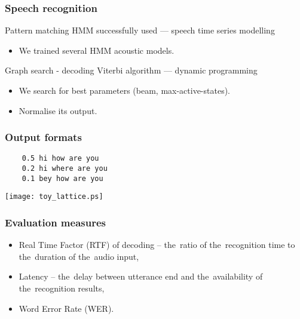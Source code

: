 \begin{frame}\frametitle{Speech recognition} 
    \begin{block}{Pattern matching}
        HMM successfully used --- speech time series modelling
        \begin{itemize}
            \item We trained several HMM acoustic models.
        \end{itemize}
    \end{block}
    \begin{exampleblock}{Graph search - decoding}
        Viterbi algorithm --- dynamic programming
        \begin{itemize}
            \item We search for best parameters (beam, max-active-states).
            \item Normalise its output.
        \end{itemize}
    \end{exampleblock}
\end{frame}


\begin{frame}[fragile]\frametitle{Output formats} 

\begin{verbatim}
    0.5 hi how are you
    0.2 hi where are you
    0.1 bey how are you
\end{verbatim}

    \begin{center}
        \texttt{[image: toy\_lattice.ps]}
    \end{center}
\end{frame}

\begin{frame}\frametitle{Evaluation measures} 
    \begin{itemize}
        \item Real Time Factor (RTF) of decoding -- the~ratio of the~recognition time to the~duration of the~audio input,
        \item Latency -- the~delay between utterance end and the~availability of the~recognition results,
        \item Word Error Rate (WER).
    \end{itemize}
\end{frame}


